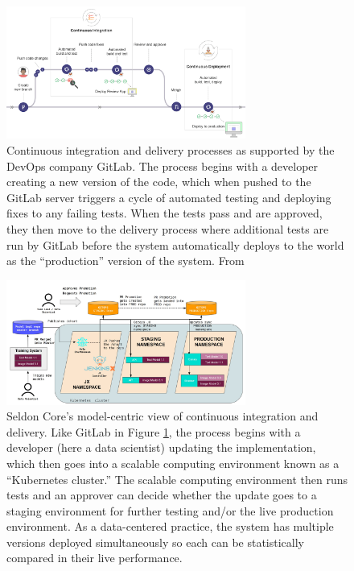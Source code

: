\begin{figure}[ht]
    \centering
    \includegraphics[width=0.7\textwidth]{images/gitlab_workflow_example_11_9.png}
    \caption{Continuous integration and delivery processes as supported by the DevOps company GitLab. The process begins with a developer creating a new version of the code, which when pushed to the GitLab server triggers a cycle of automated testing and deploying fixes to any failing tests. When the tests pass and are approved, they then move to the delivery process where additional tests are run by GitLab before the system automatically deploys to the world as the ``production'' version of the system. From \cite{gitlab_cicd_2022}}
    \label{fig:gitlab}
\end{figure}

\begin{figure}[ht]
    \centering
    \includegraphics[width=0.7\textwidth]{images/cicd-seldon.jpeg}
    \caption{Seldon Core's model-centric view of continuous integration and delivery. Like GitLab in Figure \ref{fig:gitlab}, the process begins with a developer (here a data scientist) updating the implementation, which then goes into a scalable computing environment known as a ``Kubernetes cluster.'' The scalable computing environment then runs tests and an approver can decide whether the update goes to a staging environment for further testing and/or the live production environment. As a data-centered practice, the system has multiple versions deployed simultaneously so each can be statistically compared in their live performance. \cite{seldon_core_seldon_2022}}
    \label{fig:seldon}
\end{figure}





